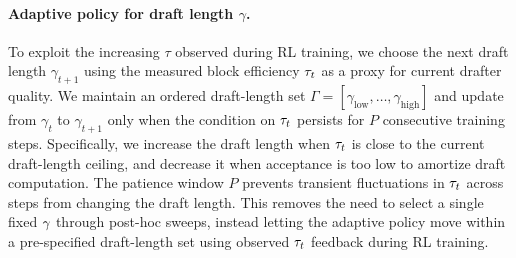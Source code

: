 \paragraph{Adaptive policy for draft length $\gamma$.}
To exploit the increasing $\tau$ observed during RL training, we choose the next draft length $\gamma_{t+1}$ using the measured block efficiency $\tau_t$ as a proxy for current drafter quality.
We maintain an ordered draft-length set $\Gamma=[\gamma_{\mathrm{low}},\dots,\gamma_{\mathrm{high}}]$ and update from $\gamma_t$ to $\gamma_{t+1}$ only when the condition on $\tau_t$ persists for $P$ consecutive training steps.
Specifically, we increase the draft length when $\tau_t$ is close to the current draft-length ceiling, and decrease it when acceptance is too low to amortize draft computation.
The patience window $P$ prevents transient fluctuations in $\tau_t$ across steps from changing the draft length.
This removes the need to select a single fixed $\gamma$ through post-hoc sweeps, instead letting the adaptive policy move within a pre-specified draft-length set using observed $\tau_t$ feedback during RL training.


